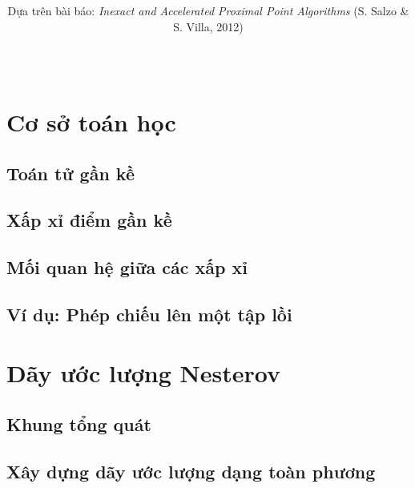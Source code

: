 \documentclass[aspectratio=169]{beamer}
\title[\myshorttitle]{\textbf{\mytitle}}
\subtitle{\small Dựa trên bài báo: \textit{Inexact and Accelerated Proximal Point Algorithms} (S. Salzo \& S. Villa, 2012)\normalsize}
\author[\mygroup]{
    \textbf{\mygroup} \\
    \vspace{4pt} %
    {\small\mymembers}
}
\institute[\myshortschool]{
    {\small\textbf{Giảng viên hướng dẫn: }\mysupervisor\\
    \vspace{2pt}
    \mylongschool}
}
\date[\myshortdate]{\small\mylongdate}
\let\realsection\section
\let\realsubsection\subsection
\let\realsubsubsection\subsubsection
\renewcommand{\subsection}{\realsubsubsection}
\renewcommand{\section}{\realsubsection}
\newcommand{\chapter}{\realsection}
\begin{document}
	\nocite{salzovilla2012}
	\frame{\titlepage}
    \chapter{Cơ sở toán học}
    \section{Toán tử gần kề}\label{sec:setting}
    \begin{frame}[allowframebreaks]
    
    \end{frame}
    \section{Xấp xỉ điểm gần kề}
    \begin{frame}[allowframebreaks]
    
    \end{frame}
    \section{Mối quan hệ giữa các xấp xỉ}
    \begin{frame}[allowframebreaks]
    
    \end{frame}
    \section{Ví dụ: Phép chiếu lên một tập lồi}\label{sec:example-projection}
    \begin{frame}[allowframebreaks]
    
    \end{frame}
    \chapter{Dãy ước lượng Nesterov}\label{sec:estimate}
    
    \section{Khung tổng quát}
    \begin{frame}[allowframebreaks]
    
    \end{frame}
    \section{Xây dựng dãy ước lượng dạng toàn phương}
    \begin{frame}[allowframebreaks]
    
    \end{frame}
\end{document}
